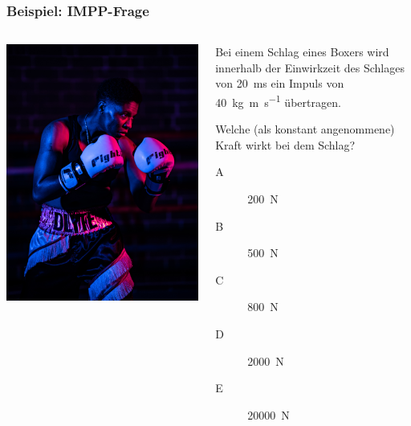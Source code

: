 \documentclass{beamer}
\begin{document}
\begin{frame}
\frametitle{Beispiel: IMPP-Frage}

\begin{columns}[c]
\begin{column}{5cm}
\begin{center}
    \includegraphics[width=\textwidth]{boxer}
\end{center}

\end{column}

\begin{column}{6cm}
Bei einem Schlag eines Boxers wird innerhalb der Einwirkzeit des Schlages von \SI{20}{\milli\second} ein Impuls von \SI{40}{\kilogram\meter\per\second} übertragen. 

Welche (als konstant angenommene) Kraft wirkt bei dem Schlag? \\[0.5 cm]

\begin{description}
\item[A] \SI{200}{N}
\item[B] \SI{500}{N}
\item[C] \SI{800}{N}
\item[D] \SI{2000}{N}
\item[E] \SI{20000}{N}
\end{description}

\end{column}


\end{columns}

\end{frame}
\end{document}

